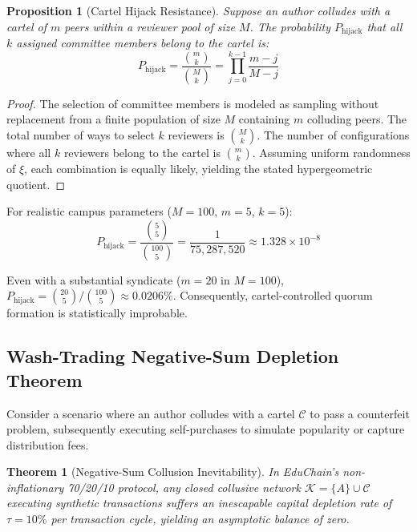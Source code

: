 \documentclass[conference,10pt]{IEEEtran}
\newtheorem{theorem}{Theorem}
\newtheorem{proposition}{Proposition}
\begin{document}
\begin{proposition}[Cartel Hijack Resistance]
Suppose an author colludes with a cartel of $m$ peers within a reviewer pool of size $M$. The probability $P_{\text{hijack}}$ that all $k$ assigned committee members belong to the cartel is:
\begin{equation}
    P_{\text{hijack}} = \frac{\binom{m}{k}}{\binom{M}{k}} = \prod_{j=0}^{k-1} \frac{m - j}{M - j}
\end{equation}
\end{proposition}

\begin{proof}
The selection of committee members is modeled as sampling without replacement from a finite population of size $M$ containing $m$ colluding peers. The total number of ways to select $k$ reviewers is $\binom{M}{k}$. The number of configurations where all $k$ reviewers belong to the cartel is $\binom{m}{k}$. Assuming uniform randomness of $\xi$, each combination is equally likely, yielding the stated hypergeometric quotient.
\end{proof}

For realistic campus parameters ($M = 100$, $m = 5$, $k = 5$):
\begin{equation}
    P_{\text{hijack}} = \frac{\binom{5}{5}}{\binom{100}{5}} = \frac{1}{75,287,520} \approx 1.328 \times 10^{-8}
\end{equation}

Even with a substantial syndicate ($m = 20$ in $M = 100$), $P_{\text{hijack}} = \binom{20}{5} / \binom{100}{5} \approx 0.0206\%$. Consequently, cartel-controlled quorum formation is statistically improbable.

\subsection{Wash-Trading Negative-Sum Depletion Theorem}
Consider a scenario where an author colludes with a cartel $\mathcal{C}$ to pass a counterfeit problem, subsequently executing self-purchases to simulate popularity or capture distribution fees.

\begin{theorem}[Negative-Sum Collusion Inevitability]
In EduChain's non-inflationary 70/20/10 protocol, any closed collusive network $\mathcal{K} = \{A\} \cup \mathcal{C}$ executing synthetic transactions suffers an inescapable capital depletion rate of $\tau = 10\%$ per transaction cycle, yielding an asymptotic balance of zero.
\end{theorem}
\end{document}
